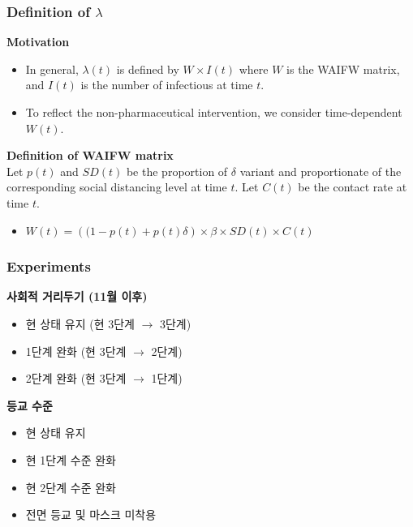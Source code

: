 \documentclass[aspectratio=169, 9pt, xcolor=dvipsnames]{beamer}
\begin{document}
	\begin{frame}\frametitle{Definition of $\lambda$}
		\textbf{Motivation}
	    \begin{itemize}
	    	\item In general, $\lambda(t)$ is defined by $W \times I(t)$ where $W$ is the WAIFW matrix, and $I(t)$ is the number of infectious at time $t$.
	    	\item To reflect the non-pharmaceutical intervention, we consider time-dependent $W(t)$.
	    \end{itemize}
	    \vspace{0.5cm}
	    \textbf{Definition of WAIFW matrix} \\
	    Let $p(t)$ and $SD(t)$ be the proportion of $\delta$ variant and proportionate of the corresponding social distancing level at time $t$. Let $C(t)$ be the contact rate at time $t$.
	    \begin{itemize}
	    	\item $W(t) = \left((1 - p(t) + p(t) \delta\right) \times \beta \times SD(t) \times C(t)$
	    \end{itemize}
	\end{frame}

	\begin{frame}\frametitle{Experiments}
		\textbf{사회적 거리두기 (11월 이후)}
	    \begin{itemize}
	    	\item 현 상태 유지 (현 3단계 $\rightarrow$ 3단계)
	    	\item 1단계 완화 (현 3단계 $\rightarrow$ 2단계)
	    	\item 2단계 완화 (현 3단계 $\rightarrow$ 1단계)
	    \end{itemize}
	    \vspace{0.5cm}
	    \textbf{등교 수준}
	    \begin{itemize}
	    	\item 현 상태 유지
	    	\item 현 1단계 수준 완화
	    	\item 현 2단계 수준 완화
	    	\item 전면 등교 및 마스크 미착용
	    \end{itemize}
	\end{frame}
\end{document}
